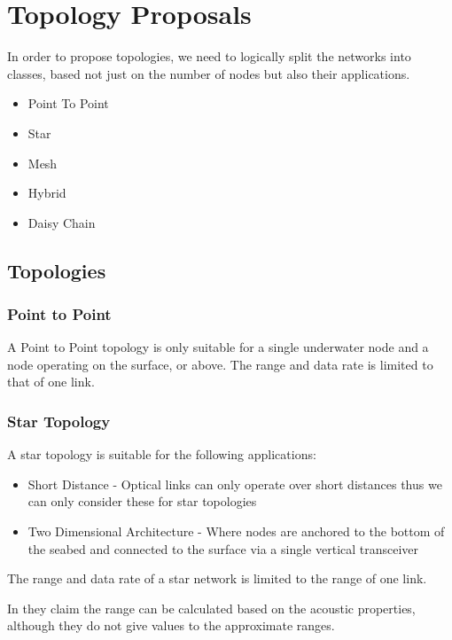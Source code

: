 \section{Topology Proposals}
In order to propose topologies, we need to logically split the networks into
classes, based not just on the number of nodes but also their applications.

\begin{itemize}
\item{Point To Point}
\item{Star}
\item{Mesh}
\item{Hybrid}
\item{Daisy Chain}
\end{itemize}

\subsection{Topologies}

\subsubsection{Point to Point}
A Point to Point topology is only suitable for a single underwater node and a
node operating on the surface, or above. The range and data rate is limited
to that of one link.

\subsubsection{Star Topology}
A star topology is suitable for the following applications:
\begin{itemize}
\item{Short Distance - Optical links can only operate over short distances thus
we can only consider these for star topologies}
\item{Two Dimensional Architecture \cite{POMPILI2009778} - Where nodes are
anchored to the bottom of the seabed and connected to the surface via a single
vertical transceiver}
\end{itemize}

The range and data rate of a star network is limited to the range of one link.

In \cite{Diamant:2017:RUA:3205025.3205060} they claim the range can be
calculated based on the acoustic properties, although they do not give values
to the approximate ranges.

